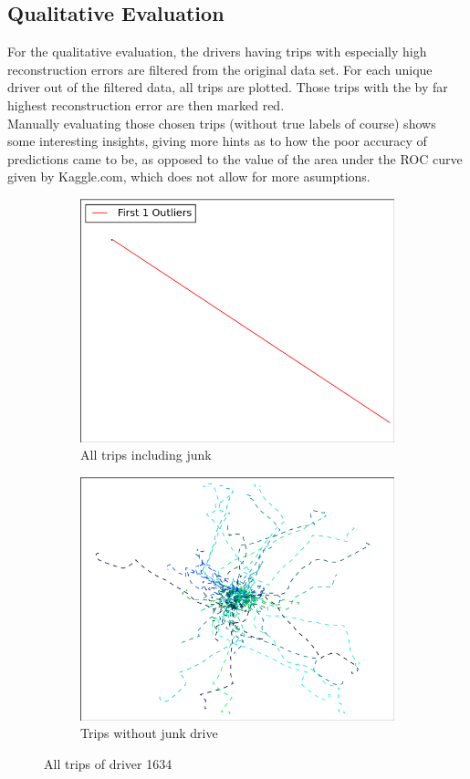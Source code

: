 \documentclass{vldb}
\begin{document}
\subsection{Qualitative Evaluation}
\label{subsec:Quali-eval}

For the qualitative evaluation, the drivers having trips with especially high reconstruction errors are filtered from the original data set. For each unique driver out of the filtered data, all trips are plotted. Those trips with the by far highest reconstruction error are then marked red. \\
Manually evaluating those chosen trips (without true labels of course) shows some interesting insights, giving more hints as to how the poor accuracy of predictions came to be, as opposed to the value of the area under the ROC curve given by Kaggle.com, which does not allow for more asumptions.
\begin{figure}
\begin{subfigure}{\linewidth}
	\centering
	\includegraphics[width=.8\linewidth]{"pics/outliers_junk/D_1634_with_136"}
	\caption{All trips including junk}
	\label{subfig:d-1634-junk}
\end{subfigure}
\begin{subfigure}{\linewidth}
  \centering
  \includegraphics[width=0.8\linewidth]{"pics/outliers_junk/D_1634_wo_136"}
\caption{Trips without junk drive}
\label{subfig:d-1634}
\end{subfigure}
\caption{All trips of driver 1634}
\label{fig:d-1634}
\end{figure}
\end{document}

